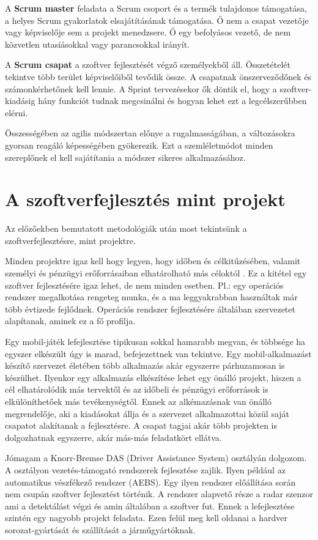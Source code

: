 \documentclass[a4paper,12pt,leqno, notitlepage]{article}%
\begin{document}
A \textbf{Scrum master} feladata a Scrum csoport és a termék tulajdonos támogatása, a helyes Scrum gyakorlatok elsajátításának támogatása. Ő nem a csapat vezetője vagy képviselője sem a projekt menedzsere. Ő egy befolyásos vezető, de nem közvetlen utasíásokkal vagy parancsokkal irányít. \cite{scrum_roles}

A \textbf{Scrum csapat} a szoftver fejlesztését végző személyekből áll. Összetételét tekintve több terület képviselőiből tevődik össze. A csapatnak önszerveződőnek és számonkérhetőnek kell lennie. A Sprint tervezésekor ők döntik el, hogy a szoftver-kiadásig hány funkciót tudnak megcsinálni és hogyan lehet ezt a legcélszerűbben elérni.\cite{scrum_roles}

Összességében az agilis módszertan előnye a rugalmasságában, a változásokra gyorsan reagáló képességében gyökerezik. Ezt a szemléletmódot minden szereplőnek el kell sajátítania a módszer sikeres alkalmazásához.
 
\section{A szoftver\-fejlesztés mint projekt}

Az előzőekben bemutatott metodológiák után most tekintsünk a szoftverfejlesztésre, mint projektre.

Minden projektre igaz kell hogy legyen, hogy időben és célkitűzésében, valamit személyi és pénzügyi erőforrásaiban elhatárolható más céloktól \cite{proj_fogalom}. Ez a kitétel egy szoftver fejlesztésére igaz lehet, de nem minden esetben. Pl.: egy operációs rendszer megalkotása rengeteg munka, és a ma leggyakrabban használtak már több évtizede fejlődnek. Operációs rendszer fejlesztésére általában szervezetet alapítanak, aminek ez a fő profilja. 

Egy mobil-játék lefejlesztése tipikusan sokkal hamarabb megvan, és többsége ha egyszer elkészült úgy is marad, befejezettnek van tekintve. Egy mobil-alkalmazást készítő szervezet életében több alkalmazás akár egyszerre párhuzamosan is készülhet. Ilyenkor egy alkalmazás elkészítése lehet egy önálló projekt, hiszen a cél elhatárolódik más tervektől és az időbeli  és pénzügyi erőforrások is elkülöníthetőek más tevékenységtől. Ennek az alkémazásnak van önálló megrendelője, aki a kiadásokat állja és a szervezet alkalmazottai közül saját csapatot alakítanak a fejlesztésre. A csapat tagjai akár több projekten is dolgozhatnak egyszerre, akár más-más feladatkört ellátva.

Jómagam a Knorr-Bremse DAS (Driver Assistance System) osztályán dolgozom. A osztályon vezetés-támogató rendszerek fejlesztése zajlik. Ilyen például az automatikus vészfékező rendszer (AEBS). Egy ilyen rendszer előállítása során nem csupán szoftver fejlesztést történik. A rendszer alapvető része a radar szenzor ami a detektálást végzi és amin általában a szoftver fut. Ennek a lefejlesztése szintén egy nagyobb projekt feladata. Ezen felül meg kell oldanai a hardver sorozat-gyártását és szállítását a járműgyártóknak.
\end{document}
